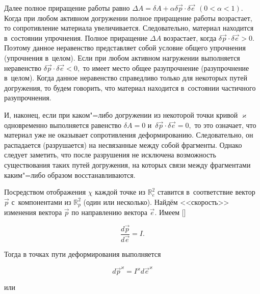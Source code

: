 Далее полное приращение работы равно $\Delta A=\delta A+\alpha\delta\overrightarrow{p}\cdot\delta\overrightarrow{e}$ $(0<\alpha<1).$ Когда при любом активном догружении полное приращение работы возрастает, то сопротивление материала увеличивается. Следовательно, материал находится в~состоянии упрочнения. Полное приращение $\Delta A$ возрастает, когда $\delta\overrightarrow{p}\cdot\delta\overrightarrow{e}>0.$ Поэтому данное неравенство представляет собой условие общего упрочнения (упрочнения в~целом). Если при любом активном нагружении выполняется неравенство $\delta\overrightarrow{p}\cdot\delta\overrightarrow{e}<0,$ то имеет место общее разупрочнение (разупрочнение в~целом). Когда данное неравенство справедливо только для некоторых путей догружения, то будем говорить, что материал находится в~состоянии частичного разупрочнения.



И, наконец, если при каком"=либо догружении из некоторой точки кривой $\varkappa$ одновременно выполняется равенство $\delta A=0$ и~$\delta\overrightarrow{p}\cdot\delta\overrightarrow{e}=0,$ то это означает, что материал уже не оказывает сопротивления деформированию. Следовательно, он распадается (разрушается) на несвязанные между собой фрагменты. Однако следует заметить, что после разрушения не исключена возможность существования таких путей догружения, на которых связи между фрагментами каким"=либо образом восстанавливаются.



 Посредством отображения $\chi$ каждой точке из $\mathbb R^2_{e}$ ставится в~соответствие вектор $\overrightarrow{p}$ с~компонентами из $\mathbb R^2_{p}$ (один или несколько). Найдём <<скорость>> изменения вектора $\overrightarrow{p}$ по направлению вектора  $\overrightarrow{e}.$ Имеем []

$$

\displaystyle\frac{d \overrightarrow{p}}{d \overrightarrow{e}}=I.

$$

Тогда в точках пути деформирования выполняется

\begin{equation}

\label{my:eq3}

d \overrightarrow{p}^\varkappa=I^\varkappa d \overrightarrow{e}^\varkappa

\end{equation}

или

